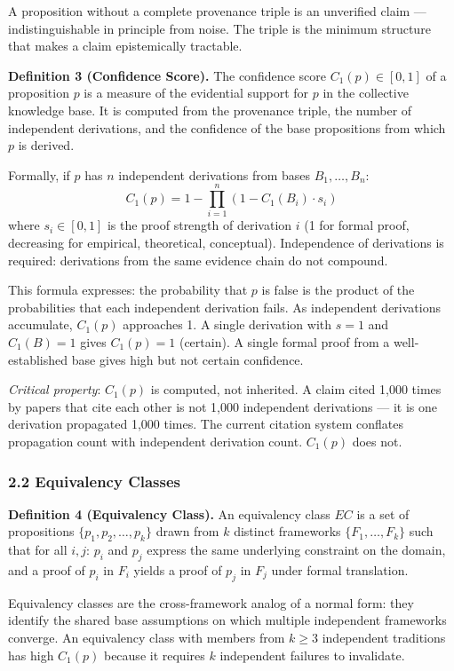 \documentclass[
]{article}
\begin{document}
A proposition without a complete provenance triple is an unverified
claim --- indistinguishable in principle from noise. The triple is the
minimum structure that makes a claim epistemically tractable.

\textbf{Definition 3 (Confidence Score).} The confidence score
\(C_1(p) \in [0,1]\) of a proposition \(p\) is a measure of the
evidential support for \(p\) in the collective knowledge base. It is
computed from the provenance triple, the number of independent
derivations, and the confidence of the base propositions from which
\(p\) is derived.

Formally, if \(p\) has \(n\) independent derivations from bases
\(B_1, \ldots, B_n\):
\[C_1(p) = 1 - \prod_{i=1}^{n}(1 - C_1(B_i) \cdot s_i)\] where
\(s_i \in [0,1]\) is the proof strength of derivation \(i\) (1 for
formal proof, decreasing for empirical, theoretical, conceptual).
Independence of derivations is required: derivations from the same
evidence chain do not compound.

This formula expresses: the probability that \(p\) is false is the
product of the probabilities that each independent derivation fails. As
independent derivations accumulate, \(C_1(p)\) approaches 1. A single
derivation with \(s = 1\) and \(C_1(B) = 1\) gives \(C_1(p) = 1\)
(certain). A single formal proof from a well-established base gives high
but not certain confidence.

\emph{Critical property}: \(C_1(p)\) is computed, not inherited. A claim
cited 1,000 times by papers that cite each other is not 1,000
independent derivations --- it is one derivation propagated 1,000 times.
The current citation system conflates propagation count with independent
derivation count. \(C_1(p)\) does not.

\subsubsection{2.2 Equivalency Classes}\label{equivalency-classes}

\textbf{Definition 4 (Equivalency Class).} An equivalency class \(EC\)
is a set of propositions \(\{p_1, p_2, \ldots, p_k\}\) drawn from \(k\)
distinct frameworks \(\{F_1, \ldots, F_k\}\) such that for all \(i, j\):
\(p_i\) and \(p_j\) express the same underlying constraint on the
domain, and a proof of \(p_i\) in \(F_i\) yields a proof of \(p_j\) in
\(F_j\) under formal translation.

Equivalency classes are the cross-framework analog of a normal form:
they identify the shared base assumptions on which multiple independent
frameworks converge. An equivalency class with members from \(k \geq 3\)
independent traditions has high \(C_1(p)\) because it requires \(k\)
independent failures to invalidate.
\end{document}

